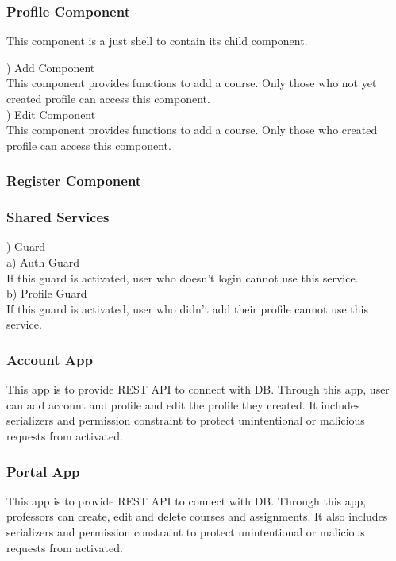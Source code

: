 \documentclass[10pt,journal,compsoc]{IEEEtran}
\begin{document}
\subsubsection{Profile Component}
This component is a just shell to contain its child component.

\null{})	Add Component\\
This component provides functions to add a course. Only those who not yet created profile can access this component.\\

\null{})	Edit Component\\
This component provides functions to add a course. Only those who created profile can access this component.\\

\subsubsection{Register Component}

\subsubsection{Shared Services}

\null{})	Guard\\

\null\qquad a)	Auth Guard\\
If this guard is activated, user who doesn't login cannot use this service.\\

\null\qquad b)	Profile Guard\\
If this guard is activated, user who didn’t add their profile cannot use this service.\\
\subsubsection{Account App}
This app is to provide REST API to connect with DB. Through this app, user can add account and profile and edit the profile they created. It includes serializers and permission constraint to protect unintentional or malicious requests from activated.
\subsubsection{Portal App}
This app is to provide REST API to connect with DB. Through this app, professors can create, edit and delete courses and assignments. It also includes serializers and permission constraint to protect unintentional or malicious requests from activated.
\end{document}
